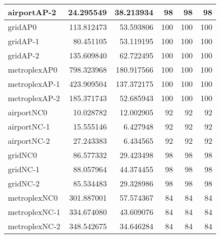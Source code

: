 \begin{longtable}{|l|r|r|r|r|r|}
airportAP-2 & 24.295549 & 38.213934 & 98 & 98 & 98 \\ \hline
gridAP0 & 113.812473 & 53.593806 & 100 & 100 & 100 \\ \hline
gridAP-1 & 80.451105 & 53.119195 & 100 & 100 & 100 \\ \hline
gridAP-2 & 135.609840 & 62.722495 & 100 & 100 & 100 \\ \hline
metroplexAP0 & 798.323968 & 180.917566 & 100 & 100 & 100 \\ \hline
metroplexAP-1 & 423.909504 & 137.372175 & 100 & 100 & 100 \\ \hline
metroplexAP-2 & 185.371743 & 52.685943 & 100 & 100 & 100 \\ \hline
airportNC0 & 10.028782 & 12.002905 & 92 & 92 & 92 \\ \hline
airportNC-1 & 15.555146 & 6.427948 & 92 & 92 & 92 \\ \hline
airportNC-2 & 27.243383 & 6.434565 & 92 & 92 & 92 \\ \hline
gridNC0 & 86.577332 & 29.423498 & 98 & 98 & 98 \\ \hline
gridNC-1 & 88.057964 & 44.374455 & 98 & 98 & 98 \\ \hline
gridNC-2 & 85.534483 & 29.328986 & 98 & 98 & 98 \\ \hline
metroplexNC0 & 301.887001 & 57.574367 & 84 & 84 & 84 \\ \hline
metroplexNC-1 & 334.674080 & 43.609076 & 84 & 84 & 84 \\ \hline
metroplexNC-2 & 348.542675 & 34.646284 & 84 & 84 & 84 \\ \hline
\end{longtable}
